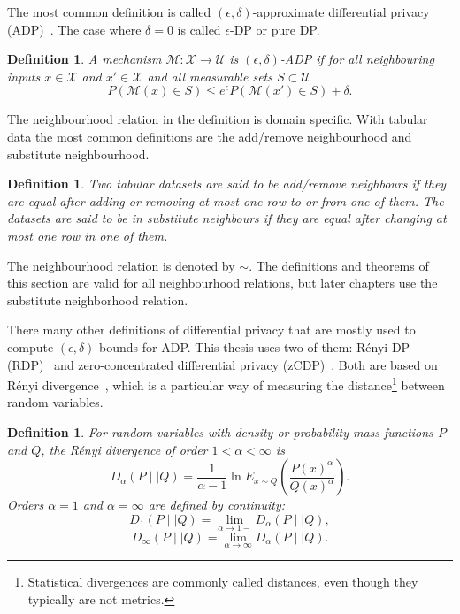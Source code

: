 \documentclass[english,twoside,openright]{HYgraduMLDS}
\newtheorem{definition}[lemma]{Definition}
\newcommand{\dmid}{\mid\mid}
\newcommand{\calm}{{\mathcal{M}}}
\newcommand{\calx}{{\mathcal{X}}}
\newcommand{\calu}{{\mathcal{U}}}
\begin{document}
The most common definition is called \((\epsilon, \delta)\)-approximate
differential privacy (ADP)~\cite{DKM06, DwR14}.
The case where \(\delta = 0\) is called \(\epsilon\)-DP or 
pure DP.

\begin{definition}\label{ADP-definition}
    A mechanism \(\calm\colon \calx \to \calu\) is \((\epsilon, \delta)\)-ADP if
    for all neighbouring inputs \(x\in \calx\) and \(x'\in \calx\) and 
    all measurable sets \(S \subset \calu\)
    \[
        P(\calm(x)\in S) \leq e^\epsilon P(\calm(x')\in S) + \delta.
    \]
\end{definition}

The neighbourhood relation in the definition is domain specific. With tabular 
data the most common definitions are the add/remove neighbourhood and 
substitute neighbourhood.
\begin{definition}
    Two tabular datasets are said to be add/remove neighbours if they are equal 
    after adding or removing at most one row to or from one of them. The datasets 
    are said to be in substitute neighbours if they are equal after 
    changing at most one row in one of them.
\end{definition}
The neighbourhood relation is denoted by \(\sim\). The definitions and 
theorems of this section are valid for all neighbourhood relations, but later
chapters use the substitute neighborhood relation.

There many other definitions of differential privacy that are mostly used
to compute \((\epsilon, \delta)\)-bounds for ADP. This thesis uses two of them: 
Rényi-DP (RDP)~\cite{Mironov17} and 
zero-concentrated differential privacy (zCDP)~\cite{BuS16}. Both are based 
on Rényi divergence~\cite{Mironov17}, which is a particular way of 
measuring the distance\footnote{
  Statistical divergences are commonly called distances, even though they
  typically are not metrics.
} between random variables.

\begin{definition}
    For random variables with density or probability mass functions 
    \(P\) and \(Q\), the Rényi divergence of order
    \(1 < \alpha < \infty\) is
    \[
        D_\alpha(P\dmid Q) = \frac{1}{\alpha - 1}\ln E_{x\sim Q}
        \left(\frac{P(x)^\alpha}{Q(x)^\alpha}\right).
    \]
    Orders \(\alpha = 1\) and \(\alpha = \infty\) are defined 
    by continuity:
    \[
        D_1(P\dmid Q) = \lim_{\alpha \to 1-} D_\alpha(P\dmid Q),
    \]
    \[
        D_\infty(P \dmid Q) = \lim_{\alpha\to \infty}D_\alpha(P\dmid Q).
    \]
\end{definition}
\end{document}
